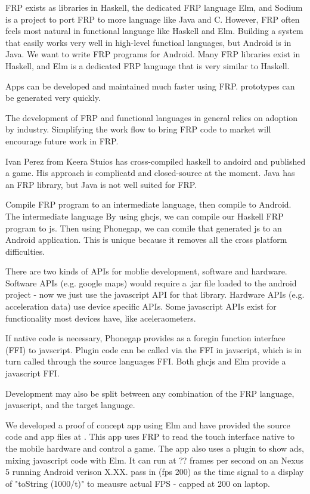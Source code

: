 \documentclass{sigplanconf}
\begin{document}

FRP exists as libraries in Haskell, the dedicated FRP language Elm, and Sodium is a project to port FRP to more language like Java and C.
However, FRP often feels most natural in functional language like Haskell and Elm.
Building a system that easily 
works very well in high-level functioal languages, but Android is in Java.
We want to write FRP programs for Android.
Many FRP libraries exist in Haskell, and Elm is a dedicated FRP language that is very similar to Haskell.

Apps can be developed and maintained much faster using FRP.
prototypes can be generated very quickly.

The development of FRP and functional languages in general relies on adoption by industry.
Simplifying the work flow to bring FRP code to market will encourage future work in FRP.

Ivan Perez from Keera Stuios has cross-compiled haskell to andoird and published a game.
His approach is complicatd and closed-source at the moment.
Java has an FRP library, but Java is not well suited for FRP.

Compile FRP program to an intermediate language, then compile to Android.
The intermediate language 
By using ghcjs, we can compile our Haskell FRP program to js.
Then using Phonegap, we can comile that generated js to an Android application.
This is unique because it removes all the cross platform difficulties.

There are two kinds of APIs for moblie development, software and hardware.
Software APIs (e.g. google maps) would require a .jar file loaded to the android project - now we just use the javascript API for that library.
Hardware APIs (e.g. acceleration data) use device specific APIs.
Some javascript APIs exist for functionality most devices have, like aceleraometers.

If native code is necessary, Phonegap provides  as a foregin function interface (FFI) to javscript.
Plugin code can be called via the FFI in javscript, which is in turn called through the source languages FFI.
Both ghcjs and Elm provide a javascript FFI. 

Development may also be split between any combination of the FRP language, javascript, and the target language.


We developed a proof of concept app using Elm and have provided the source code and app files at .
This app uses FRP to read the touch interface native to the mobile hardware and control a game.
The app also uses a plugin to show ads, mixing javascript code with Elm.
It can run at ?? frames per second on an Nexus 5 running Android verison X.XX.
pass in (fps 200) as the time signal to a display of "toString (1000/t)" to meausre actual FPS - capped at 200 on laptop. 
 
\end{document}
